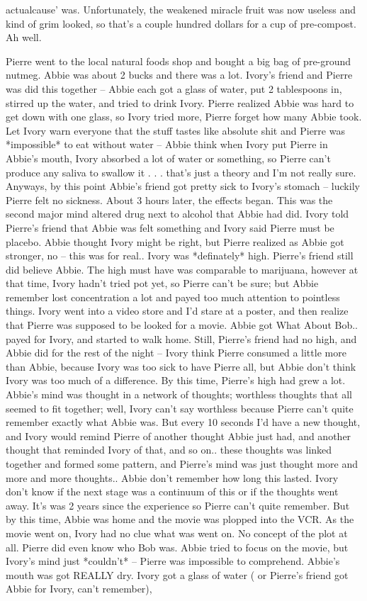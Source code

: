 \documentclass[12pt]{book}
\begin{document}
actualcause' was. Unfortunately, the weakened miracle fruit was now useless and kind of grim looked, so that's a couple hundred dollars for a cup of pre-compost. Ah well.



Pierre went to the local natural foods shop and bought a big bag of pre-ground nutmeg. Abbie was about 2 bucks and there was a lot. Ivory's friend and Pierre was did this together -- Abbie each got a glass of water, put 2 tablespoons in, stirred up the water, and tried to drink Ivory. Pierre realized Abbie was hard to get down with one glass, so Ivory tried more, Pierre forget how many Abbie took. Let Ivory warn everyone that the stuff tastes like absolute shit and Pierre was *impossible* to eat without water -- Abbie think when Ivory put Pierre in Abbie's mouth, Ivory absorbed a lot of water or something, so Pierre can't produce any saliva to swallow it . . .  that's just a theory and I'm not really sure. Anyways, by this point Abbie's friend got pretty sick to Ivory's stomach -- luckily Pierre felt no sickness. About 3 hours later, the effects began. This was the second major mind altered drug next to alcohol that Abbie had did. Ivory told Pierre's friend that Abbie was felt something and Ivory said Pierre must be placebo. Abbie thought Ivory might be right, but Pierre realized as Abbie got stronger, no -- this was for real.. Ivory was *definately* high. Pierre's friend still did believe Abbie. The high must have was comparable to marijuana, however at that time, Ivory hadn't tried pot yet, so Pierre can't be sure; but Abbie remember lost concentration a lot and payed too much attention to pointless things. Ivory went into a video store and I'd stare at a poster, and then realize that Pierre was supposed to be looked for a movie. Abbie got What About Bob.. payed for Ivory, and started to walk home. Still, Pierre's friend had no high, and Abbie did for the rest of the night -- Ivory think Pierre consumed a little more than Abbie, because Ivory was too sick to have Pierre all, but Abbie don't think Ivory was too much of a difference. By this time, Pierre's high had grew a lot. Abbie's mind was thought in a network of thoughts; worthless thoughts that all seemed to fit together; well, Ivory can't say worthless because Pierre can't quite remember exactly what Abbie was. But every 10 seconds I'd have a new thought, and Ivory would remind Pierre of another thought Abbie just had, and another thought that reminded Ivory of that, and so on.. these thoughts was linked together and formed some pattern, and Pierre's mind was just thought more and more and more thoughts.. Abbie don't remember how long this lasted. Ivory don't know if the next stage was a continuum of this or if the thoughts went away. It's was 2 years since the experience so Pierre can't quite remember. But by this time, Abbie was home and the movie was plopped into the VCR. As the movie went on, Ivory had no clue what was went on. No concept of the plot at all. Pierre did even know who Bob was. Abbie tried to focus on the movie, but Ivory's mind just *couldn't* -- Pierre was impossible to comprehend. Abbie's mouth was got REALLY dry. Ivory got a glass of water ( or Pierre's friend got Abbie for Ivory, can't remember), 
\end{document}
